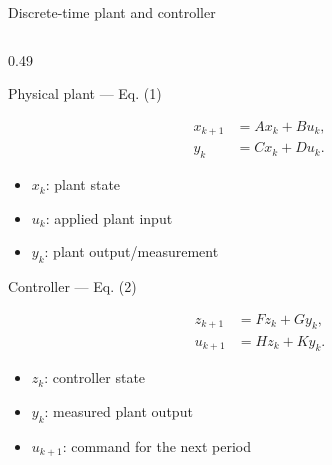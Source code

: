 \documentclass[8pt,aspectratio=169]{beamer}
\gdef\CPSOrigin{PAPER}%
\gdef\CPSSourceContext{}%
\begin{document}
\begin{frame}{Discrete-time plant and controller}
\gdef\CPSSourceContext{}
\gdef\CPSOrigin{PAPER}
\small%

\begin{columns}[T,onlytextwidth]

\begin{column}{0.49\textwidth}

\begin{block}{Physical plant --- Eq. (1)}

\[
\boxed{
\begin{aligned}
x_{k+1}&=Ax_k+Bu_k,\\
y_k&=Cx_k+Du_k.
\end{aligned}
}
\]

\vspace{-1mm}

\begin{itemize}
\tightitemize
    \item $x_k$: plant state
    \item $u_k$: applied plant input
    \item $y_k$: plant output/measurement
\end{itemize}

\end{block}

\begin{block}{Controller --- Eq. (2)}

\[
\boxed{
\begin{aligned}
z_{k+1}&=Fz_k+Gy_k,\\
u_{k+1}&=Hz_k+Ky_k.
\end{aligned}
}
\]

\vspace{-1mm}

\begin{itemize}
\tightitemize
    \item $z_k$: controller state
    \item $y_k$: measured plant output
    \item $u_{k+1}$: command for the next period
\end{itemize}

\end{block}

\end{column}



\end{columns}
\end{frame}
\end{document}
